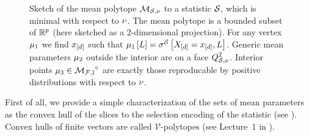 \label{sec:meanPolytopeConvexHull}

\begin{figure}[t!]
    \begin{center}
        
    \end{center}
    \caption{Sketch of the mean polytope ${\mathcal{M}_{\mathcal{S},\nu}}$ to a statistic $\mathcal{S}$, which is minimal with respect to $\nu$.
    The mean polytope is a bounded subset of $\mathbb{R}^{p}$ (here sketched as a 2-dimensional projection). %
    For any vertex $\mu_{1}$ we find $x_{[d]}$ such that $\mu_{1}\left[L\right]=\sigma^{\mathcal{S}}\left[X_{[d]}=x_{[d]},L\right]$.
    Generic mean parameters $\mu_{2}$ outside the interior are on a face $Q^{\mathcal{I}}_{\mathcal{S},\nu}$. %
    Interior points $\mu_{3}\in{\mathcal{M}_{\mathcal{F},\mathbb{I}}}^{\circ}$ are exactly those reproducable by positive distributions with respect to $\nu$.  %
    }\label{fig:meansetSketchGeneric}
\end{figure}

First of all, we provide a simple characterization of the sets of mean parameters as the convex hull of the slices to the selection encoding of the statistic (see ).
Convex hulls of finite vectors are called $\mathcal{V}$-polytopes (see Lecture~1 in \cite{ziegler_lectures_2013}).

